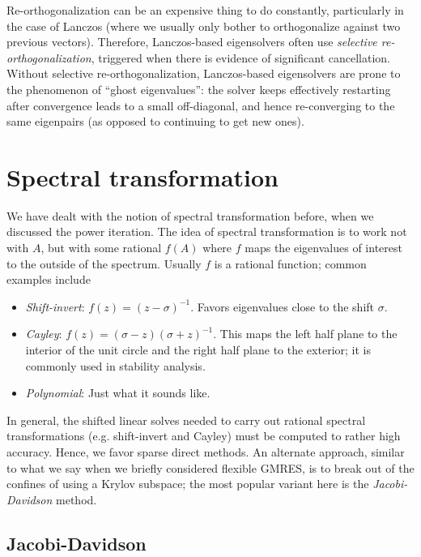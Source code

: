 \documentclass[12pt, leqno]{article} %
\begin{document}
Re-orthogonalization can be an expensive thing to do constantly,
particularly in the case of Lanczos (where we usually only bother to
orthogonalize against two previous vectors).  Therefore, Lanczos-based
eigensolvers often use {\em selective re-orthogonalization}, triggered
when there is evidence of significant cancellation.  Without selective
re-orthogonalization, Lanczos-based eigensolvers are prone to the
phenomenon of ``ghost eigenvalues'': the solver keeps effectively
restarting after convergence leads to a small off-diagonal, and hence
re-converging to the same eigenpairs (as opposed to continuing to get
new ones).

\section{Spectral transformation}

We have dealt with the notion of spectral transformation before,
when we discussed the power iteration.  The idea of spectral
transformation is to work not with $A$, but with some rational
$f(A)$ where $f$ maps the eigenvalues of interest to the outside
of the spectrum.  Usually $f$ is a rational function; common
examples include
\begin{itemize}
\item {\em Shift-invert}: $f(z) = (z-\sigma)^{-1}$.  Favors
  eigenvalues close to the shift $\sigma$.
\item {\em Cayley}: $f(z) = (\sigma-z) (\sigma +z)^{-1}$.  This maps
  the left half plane to the interior of the unit circle and the
  right half plane to the exterior; it is commonly used in stability
  analysis.
\item {\em Polynomial}: Just what it sounds like.
\end{itemize}
In general, the shifted linear solves needed to carry out rational spectral
transformations (e.g. shift-invert and Cayley) must be computed to
rather high accuracy.  Hence, we favor sparse direct methods.  An alternate
approach, similar to what we say when we briefly considered flexible GMRES,
is to break out of the confines of using a Krylov subspace; the most
popular variant here is the {\em Jacobi-Davidson} method.

\subsection{Jacobi-Davidson}
\end{document}
